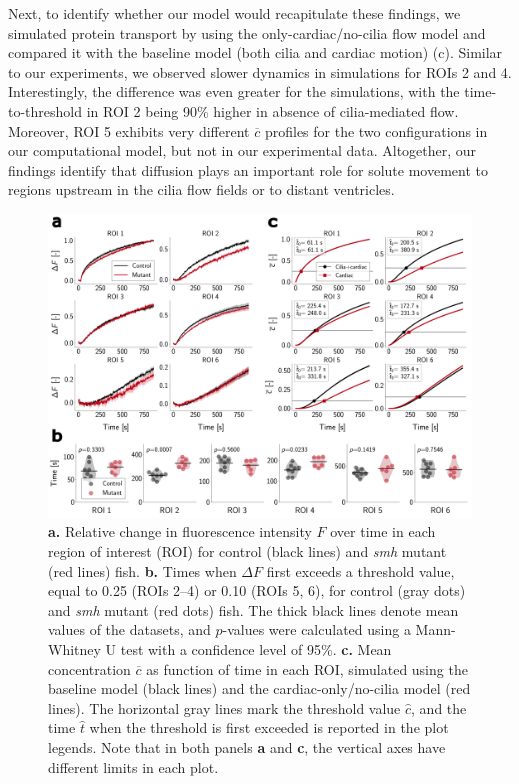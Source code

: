 \documentclass[fleqn]{wlscirep}
\newcommand{\cbar}{\overline{c}}
\begin{document}
Next, to identify whether our model would recapitulate these findings,
we simulated protein transport by using the only-cardiac/no-cilia flow model 
and compared it with the baseline model
(both cilia and cardiac motion) (c).
Similar to our experiments, we observed slower dynamics in simulations for ROIs 2 and 4.
Interestingly, the difference was even greater for the simulations,
with the time-to-threshold in ROI 2 being 90\% higher in absence of cilia-mediated flow.
Moreover, ROI 5 exhibits very different $\cbar$ profiles for the two
configurations in our computational model,
but not in our experimental data.
Altogether, our findings identify that diffusion plays an important
role for solute movement to regions upstream in the cilia flow fields or to distant ventricles.
\begin{figure}[H]
    \centering
    \includegraphics[width=\textwidth]{graphics/figure4_compare_control_mutant.png}
    \caption{\textbf{a.} Relative change in fluorescence intensity $F$ over
    time in each region of interest (ROI) for control (black lines) and \emph{smh} mutant (red lines) fish. 
    \textbf{b.} Times when $\Delta F$ first exceeds a threshold value,
    equal to 0.25 (ROIs 2--4) or 0.10 (ROIs 5, 6), for control (gray dots) and
    \emph{smh} mutant (red dots) fish.
    The thick black lines denote mean values of the datasets, and $p$-values
    were calculated using a Mann-Whitney U test with a confidence level of 95\%.
    \textbf{c.} Mean concentration $\cbar$ as function of time in each ROI,
    simulated using the baseline model (black lines) and the cardiac-only/no-cilia model (red lines).
    The horizontal gray lines mark the threshold value $\hat{c}$, and the time
    $\hat{t}$ when the threshold is first exceeded is reported in the plot legends.
    Note that in both panels \textbf{a} and \textbf{c}, the vertical axes have
    different limits in each plot.}
    \label{fig:figure4_compare_control_mutant}
\end{figure}
\end{document}

